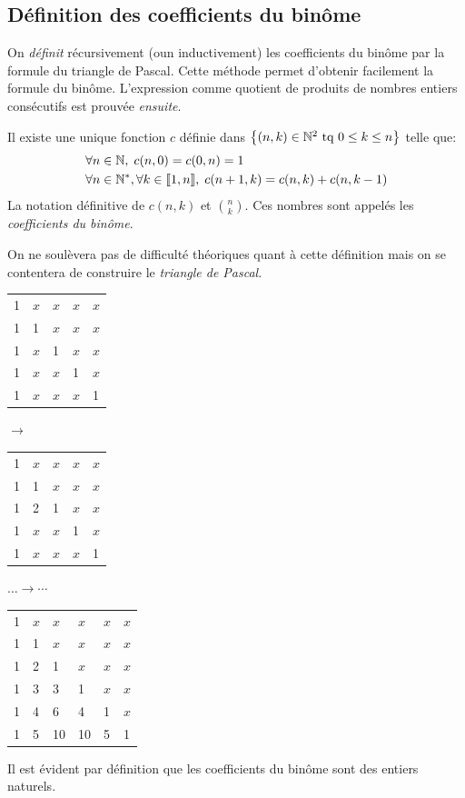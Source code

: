 \subsection{Définition des coefficients du binôme}
 On \emph{définit} récursivement (oun inductivement) les coefficients du binôme par la formule du triangle de Pascal. Cette méthode permet d'obtenir facilement la formule du binôme. L'expression comme quotient de produits de nombres entiers consécutifs est prouvée \emph{ensuite}.
\begin{defi}
  Il existe une unique fonction $c$ définie dans $\left\lbrace (n,k)\in \mathbb{N}^2\text{ tq } 0\leq k \leq n\right\rbrace$  telle que:
\begin{align}
  &\forall n \in \mathbb{N},\; c(n,0) = c(0,n)= 1 \\
  &\forall n \in \mathbb{N}^*, \forall k \in \llbracket 1,n\rrbracket,\; c(n+1,k) = c(n,k) + c(n,k-1)
\end{align}
La notation définitive de $c(n,k)$ et $\binom{n}{k}$. Ces nombres sont appelés les \emph{coefficients du binôme}.
\end{defi}
On ne soulèvera pas de difficulté théoriques quant à cette définition mais on se contentera de construire le \emph{triangle de Pascal}.
\begin{center}
\begin{tabular}{lllll}
1 & $x$ & $x$ & $x$ & $x$\\
1 & 1   & $x$ & $x$ & $x$\\
1 & $x$ & 1   & $x$ & $x$\\
1 & $x$ & $x$ & 1   & $x$\\
1 & $x$ & $x$ & $x$ & 1
\end{tabular}
$\longrightarrow$
\begin{tabular}{lllll}
1 & $x$ & $x$ & $x$ & $x$\\
1 & 1   & $x$ & $x$ & $x$\\
1 & 2 & 1   & $x$ & $x$\\
1 & $x$ & $x$ & 1   & $x$\\
1 & $x$ & $x$ & $x$ & 1
\end{tabular}
$\dots \longrightarrow \cdots$
\begin{tabular}{llllll}
1 & $x$ & $x$ & $x$ & $x$& $x$\\
1 & 1   & $x$ & $x$ & $x$& $x$\\
1 & 2   & 1   & $x$ & $x$& $x$\\
1 & 3   & 3   & 1   & $x$& $x$\\
1 & 4   & 6   & 4   & 1  & $x$\\
1 & 5   & 10  & 10  & 5  & 1
\end{tabular}
\end{center}
\begin{rems}
  Il est évident par définition que les coefficients du binôme sont des entiers naturels.  
\end{rems}

